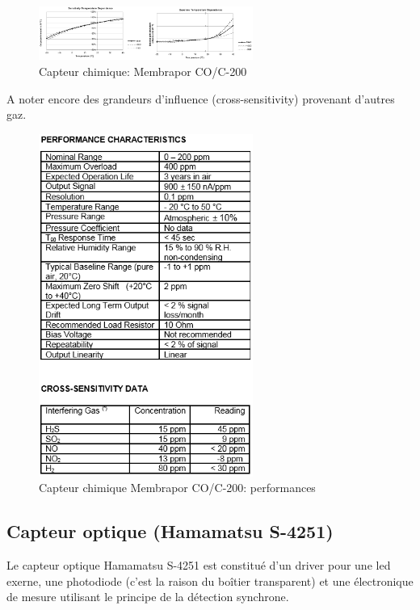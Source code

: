 \begin{figure}[h!]
\centering
\includegraphics[width=7cm]{assets/figures/4_2_13_Capteur_chimique_Membrapor_CO_C_200.PNG}
\caption{Capteur chimique: Membrapor  CO/C-200}
\label{fig:Capteur_chimique_Membrapor_CO_C_200}
\end{figure}

A noter encore des grandeurs d'influence (cross-sensitivity) provenant d'autres gaz.

\begin{figure}[h!]
\centering
\includegraphics[width=7cm]{assets/figures/4_2_13_Capteur_chimique_Membrapor_CO_C_200_performance.PNG}
\caption{Capteur chimique Membrapor  CO/C-200: performances}
\label{fig:Capteur_chimique_Membrapor_CO_C_200_performance}
\end{figure}

\subsection{Capteur optique (Hamamatsu S-4251)}

Le capteur optique Hamamatsu S-4251 est constitué d'un driver pour une led exerne, une photodiode (c'est la raison du boîtier transparent) et une électronique de mesure utilisant le principe de la détection synchrone.

